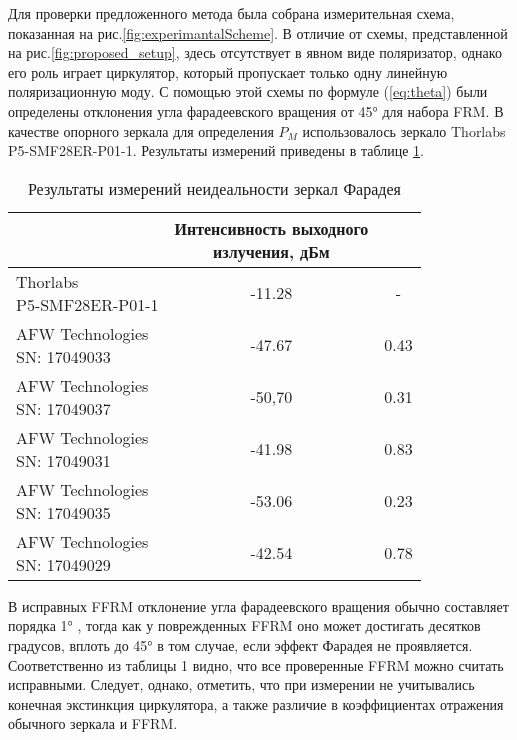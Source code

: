 \documentclass{article}
\begin{document}
Для проверки предложенного метода была собрана измерительная схема, показанная на рис.\ref{fig:experimantalScheme}. В отличие от схемы, представленной на рис.\ref{fig:proposed_setup}, здесь отсутствует в явном виде поляризатор, однако его роль играет циркулятор, который пропускает только одну линейную поляризационную моду. 
С помощью этой схемы по формуле (\ref*{eq:theta}) были определены отклонения угла фарадеевского вращения от 45° для набора FRM. В качестве опорного зеркала для определения $P_M$ использовалось зеркало Thorlabs P5-SMF28ER-P01-1. Результаты измерений приведены в таблице \ref{tabular:results}.
\begin{table}[h]
	\caption{Результаты измерений неидеальности зеркал Фарадея}
	\label{tabular:results}
		\begin{tabularx}{\textwidth}{|X|c|c|}
			\hline
			\thead{Зеркало} & \thead{Интенсивность выходного \\ излучения, дБм} & \thead{Неидеальность FRM, град} \\
			\hline
			\makecell{Thorlabs \\ P5-SMF28ER-P01-1} & -11.28 & - \\	
			\hline
			\makecell{AFW Technologies \\ SN: 17049033} & -47.67 & 0.43 \\
			\hline
			\makecell{AFW Technologies \\ SN: 17049037}	& -50,70 & 0.31 \\
			\hline
			\makecell{AFW Technologies \\ SN: 17049031}	& -41.98 & 0.83 \\
			\hline
			\makecell{AFW Technologies \\ SN: 17049035}	& -53.06 & 0.23 \\
			\hline
			\makecell{AFW Technologies \\ SN: 17049029} & -42.54 & 0.78 \\
			\hline
		\end{tabularx}
\end{table}

В исправных FFRM отклонение угла фарадеевского вращения обычно составляет порядка 1° \autocite{paschottaFaradayMirrors2022}, тогда как у поврежденных FFRM оно может достигать десятков градусов, вплоть до 45° в том случае, если эффект Фарадея не проявляется. Соответственно из таблицы 1 видно, что все проверенные FFRM можно считать исправными. Следует, однако, отметить, что при измерении не учитывались конечная экстинкция циркулятора, а также различие в коэффициентах отражения обычного зеркала и FFRM. 
\end{document}
